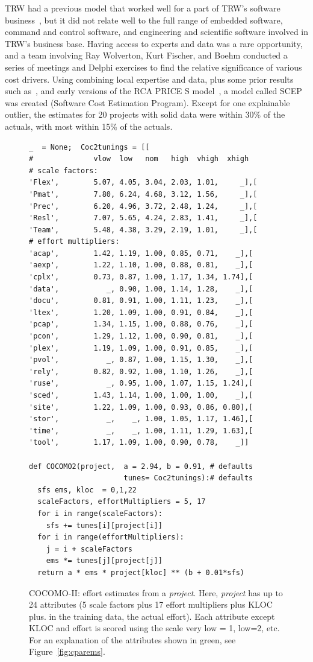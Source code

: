 \documentclass{sig-alternate}
\newcommand{\fig}[1]{Figure~\ref{fig:#1}}
\begin{document}
TRW had a previous model that worked well for a part
of TRW's software business~\cite{wol74}, but it
did not relate well to the full range of embedded
software, command and control software, and
engineering and scientific software involved in
TRW's business base.  Having access to experts and
data was a rare opportunity, and a team involving
Ray Wolverton, Kurt Fischer, and Boehm conducted a
series of meetings and Delphi exercises to find
the relative significance of various  cost
drivers. Using combining local expertise  and data, plus some prior results 
such as~\cite{putnam76,black77,herd77,watson77},  and early versions of the RCA
PRICE S model~\cite{frei79}, a model called SCEP was created (Software Cost
Estimation Program).
Except for
one explainable outlier, the estimates for
 20 projects with solid data were within 30\% of
the actuals, with most within 15\% of the actuals.

\begin{figure}[!t]
\begin{lstlisting}
_  = None;  Coc2tunings = [[
#              vlow  low   nom   high  vhigh  xhigh   
# scale factors:
'Flex',        5.07, 4.05, 3.04, 2.03, 1.01,     _],[
'Pmat',        7.80, 6.24, 4.68, 3.12, 1.56,     _],[
'Prec',        6.20, 4.96, 3.72, 2.48, 1.24,     _],[
'Resl',        7.07, 5.65, 4.24, 2.83, 1.41,     _],[
'Team',        5.48, 4.38, 3.29, 2.19, 1.01,     _],[
# effort multipliers:        
'acap',        1.42, 1.19, 1.00, 0.85, 0.71,    _],[
'aexp',        1.22, 1.10, 1.00, 0.88, 0.81,    _],[
'cplx',        0.73, 0.87, 1.00, 1.17, 1.34, 1.74],[
'data',           _, 0.90, 1.00, 1.14, 1.28,    _],[
'docu',        0.81, 0.91, 1.00, 1.11, 1.23,    _],[
'ltex',        1.20, 1.09, 1.00, 0.91, 0.84,    _],[
'pcap',        1.34, 1.15, 1.00, 0.88, 0.76,    _],[ 
'pcon',        1.29, 1.12, 1.00, 0.90, 0.81,    _],[
'plex',        1.19, 1.09, 1.00, 0.91, 0.85,    _],[ 
'pvol',           _, 0.87, 1.00, 1.15, 1.30,    _],[
'rely',        0.82, 0.92, 1.00, 1.10, 1.26,    _],[
'ruse',           _, 0.95, 1.00, 1.07, 1.15, 1.24],[
'sced',        1.43, 1.14, 1.00, 1.00, 1.00,    _],[ 
'site',        1.22, 1.09, 1.00, 0.93, 0.86, 0.80],[ 
'stor',           _,    _, 1.00, 1.05, 1.17, 1.46],[
'time',           _,    _, 1.00, 1.11, 1.29, 1.63],[
'tool',        1.17, 1.09, 1.00, 0.90, 0.78,    _]]

def COCOMO2(project,  a = 2.94, b = 0.91, # defaults
                      tunes= Coc2tunings):# defaults 
  sfs ems, kloc  = 0,1,22          
  scaleFactors, effortMultipliers = 5, 17
  for i in range(scaleFactors):
    sfs += tunes[i][project[i]]
  for i in range(effortMultipliers):
    j = i + scaleFactors
    ems *= tunes[j][project[j]] 
  return a * ems * project[kloc] ** (b + 0.01*sfs) 
\end{lstlisting}
\caption{COCOMO-II: effort estimates from a {\em project}.
Here, {\em project} has up to 24 attributes  (5 scale
factors plus 17 effort multipliers plus KLOC plus. in the training data, the actual effort).
Each attribute except KLOC and effort is scored
using the scale very low = 1, low=2, etc.
For an explanation of the attributes shown in
green, see \fig{cparems}.}\label{fig:coc2}
\end{figure}
\end{document}
